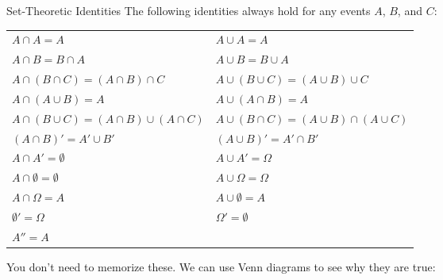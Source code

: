 \documentclass[xcolor=table]{beamer}
\begin{document}
\begin{frame}{Set-Theoretic Identities}
The following identities always hold for any events $A$, $B$, and $C$:

\begin{block}{}
\small \begin{tabular}{l|l}
$A \cap A = A$ & $A \cup A = A$ \\
$A \cap B = B \cap A$ &  $A \cup B = B \cup A$ \\ 
$A \cap (B \cap C) = (A \cap B) \cap C$ & $A \cup (B \cup C) = (A \cup B) \cup C$ \\
$A \cap (A \cup B) = A$ & $A \cup (A \cap B) = A$ \\
$A \cap (B \cup C) = (A \cap B) \cup (A \cap C)$ &
$A \cup (B \cap C) = (A \cup B) \cap (A \cup C)$ \\
$(A \cap B)' = A' \cup B'$ & $(A \cup B)' = A' \cap B'$  \\
$A \cap A' = \emptyset$ & $A \cup A' = \Omega$ \\
$A \cap \emptyset = \emptyset$ & $A \cup \Omega = \Omega$ \\
$A \cap \Omega = A$ & $A \cup \emptyset = A$ \\
$\emptyset' = \Omega$ & $\Omega' = \emptyset$ \\ 
$A'' = A$ & \\
\end{tabular}
\end{block}
\pause

You don't need to memorize these. We can use Venn diagrams to see why they are true:
\end{frame}
\end{document}
